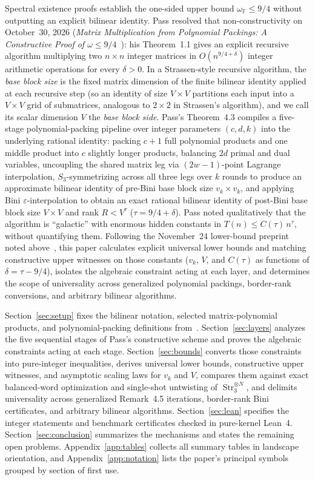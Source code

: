 \documentclass[11pt,a4paper]{article}
\theoremstyle{plain}
\theoremstyle{definition}
\theoremstyle{remark}
\newcommand{\F}{\mathbb{F}}
\DeclareMathOperator{\Str}{Str}
\begin{document}
Spectral existence proofs establish the one-sided upper bound $\omega_{\F} \le 9/4$ without outputting an explicit bilinear identity. Pass resolved that non-constructivity on October~30, 2026 (\emph{Matrix Multiplication from Polynomial Packings: A Constructive Proof of $\omega \le 9/4$}~\cite{Pass2026}): his Theorem~1.1 gives an explicit recursive algorithm multiplying two $n \times n$ integer matrices in $O(n^{9/4 + \delta})$ integer arithmetic operations for every $\delta > 0$. In a Strassen-style recursive algorithm, the \emph{base block size} is the fixed matrix dimension of the finite bilinear identity applied at each recursive step (so an identity of size $V \times V$ partitions each input into a $V \times V$ grid of submatrices, analogous to $2 \times 2$ in Strassen's algorithm), and we call its scalar dimension $V$ the \emph{base block side}. Pass's Theorem~4.3 compiles a five-stage polynomial-packing pipeline over integer parameters $(c, d, k)$ into the underlying rational identity: packing $c + 1$ full polynomial products and one middle product into $c$ slightly longer products, balancing $2d$ primal and dual variables, uncoupling the shared matrix leg via $(2w - 1)$-point Lagrange interpolation, $S_3$-symmetrizing across all three legs over $k$ rounds to produce an approximate bilinear identity of pre-Bini base block size $v_k \times v_k$, and applying Bini $\varepsilon$-interpolation to obtain an exact rational bilinear identity of post-Bini base block size $V \times V$ and rank $R < V^\tau$ ($\tau = 9/4 + \delta$). Pass noted qualitatively that the algorithm is ``galactic'' with enormous hidden constants in $T(n) \le C(\tau)\,n^\tau$, without quantifying them. Following the November~24 lower-bound preprint noted above~\cite{OpenAI2026Lower}, this paper calculates explicit universal lower bounds and matching constructive upper witnesses on those constants ($v_k$, $V$, and $C(\tau)$ as functions of $\delta = \tau - 9/4$), isolates the algebraic constraint acting at each layer, and determines the scope of universality across generalized polynomial packings, border-rank conversions, and arbitrary bilinear algorithms.

Section~\ref{sec:setup} fixes the bilinear notation, selected matrix-polynomial products, and polynomial-packing definitions from~\cite{Pass2026}. Section~\ref{sec:layers} analyzes the five sequential stages of Pass's constructive scheme and proves the algebraic constraints acting at each stage. Section~\ref{sec:bounds} converts those constraints into pure-integer inequalities, derives universal lower bounds, constructive upper witnesses, and asymptotic scaling laws for $v_k$ and $V$, compares them against exact balanced-word optimization and single-shot untwisting of $\Str_3^{\otimes N}$, and delimits universality across generalized Remark~4.5 iterations, border-rank Bini certificates, and arbitrary bilinear algorithms. Section~\ref{sec:lean} specifies the integer statements and benchmark certificates checked in pure-kernel Lean~4. Section~\ref{sec:conclusion} summarizes the mechanisms and states the remaining open problems. Appendix~\ref{app:tables} collects all summary tables in landscape orientation, and Appendix~\ref{app:notation} lists the paper's principal symbols grouped by section of first use.
\end{document}
